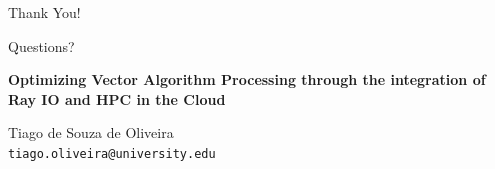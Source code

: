 \documentclass[aspectratio=169]{beamer}
\begin{document}
\begin{frame}[plain]
    \begin{center}
        \Huge Thank You!
        
        \vspace{1cm}
        \Large Questions?
        
        \vspace{0.8cm}
        \normalsize
        \textbf{Optimizing Vector Algorithm Processing through the integration of Ray IO and HPC in the Cloud}
        
        \vspace{0.5cm}
        Tiago de Souza de Oliveira \\
        \texttt{tiago.oliveira@university.edu}
    \end{center}
\end{frame}
\end{document}
